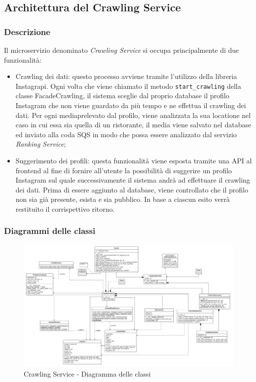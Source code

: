 \subsection{Architettura del Crawling Service}

\subsubsection{Descrizione}
Il microservizio denominato \textit{Crawling Service} si occupa principalmente di due funzionalità:
\begin{itemize}
    \item Crawling dei dati: questo processo avviene tramite l'utilizzo della libreria Instagrapi. Ogni volta che viene chiamato il metodo \texttt{start\_crawling} della classe FacadeCrawling, il sistema sceglie dal proprio database il profilo Instagram che non viene guardato da più tempo e ne effettua il crawling dei dati. Per ogni media\glo prelevato dal profilo, viene analizzata la sua location\glo e nel caso in cui essa sia quella di un ristorante, il media viene salvato nel database ed inviato alla coda SQS in modo che possa essere analizzato dal servizio \textit{Ranking Service};
    \item Suggerimento dei profili: questa funzionalità viene esposta tramite una API al frontend al fine di fornire all'utente la possibilità di suggerire un profilo Instagram sul quale successivamente il sistema andrà ad effettuare il crawling dei dati. Prima di essere aggiunto al database, viene controllato che il profilo non sia già presente, esista e sia pubblico. In base a ciascun esito verrà restituito il corrispettivo ritorno.
\end{itemize}

\subsubsection{Diagrammi delle classi}
\begin{figure}[h]
    \centering
    \includegraphics[scale=0.35]{Contenuto/Immagini/classi-CS.PNG}
    \caption{Crawling Service - Diagramma delle classi}
\end{figure}
